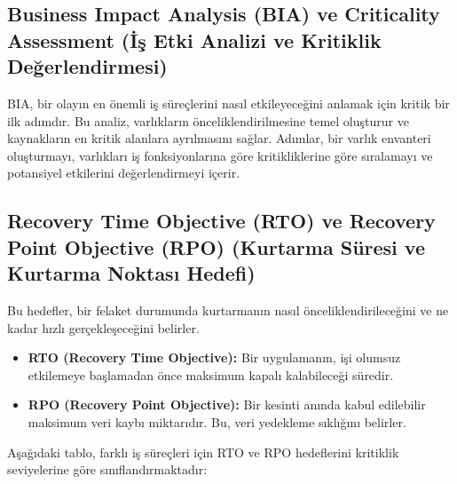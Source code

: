 \subsection{Business Impact Analysis (BIA) ve Criticality Assessment (İş Etki Analizi ve Kritiklik Değerlendirmesi)}

BIA, bir olayın en önemli iş süreçlerini nasıl etkileyeceğini anlamak için kritik bir ilk adımdır. Bu analiz, varlıkların önceliklendirilmesine temel oluşturur ve kaynakların en kritik alanlara ayrılmasını sağlar. Adımlar, bir varlık envanteri oluşturmayı, varlıkları iş fonksiyonlarına göre kritikliklerine göre sıralamayı ve potansiyel etkilerini değerlendirmeyi içerir.

\subsection{Recovery Time Objective (RTO) ve Recovery Point Objective (RPO) (Kurtarma Süresi ve Kurtarma Noktası Hedefi)}

Bu hedefler, bir felaket durumunda kurtarmanın nasıl önceliklendirileceğini ve ne kadar hızlı gerçekleşeceğini belirler.
\begin{itemize}
    \item \textbf{RTO (Recovery Time Objective):} Bir uygulamanın, işi olumsuz etkilemeye başlamadan önce maksimum kapalı kalabileceği süredir.
    \item \textbf{RPO (Recovery Point Objective):} Bir kesinti anında kabul edilebilir maksimum veri kaybı miktarıdır. Bu, veri yedekleme sıklığını belirler.
\end{itemize}

Aşağıdaki tablo, farklı iş süreçleri için RTO ve RPO hedeflerini kritiklik seviyelerine göre sınıflandırmaktadır:

